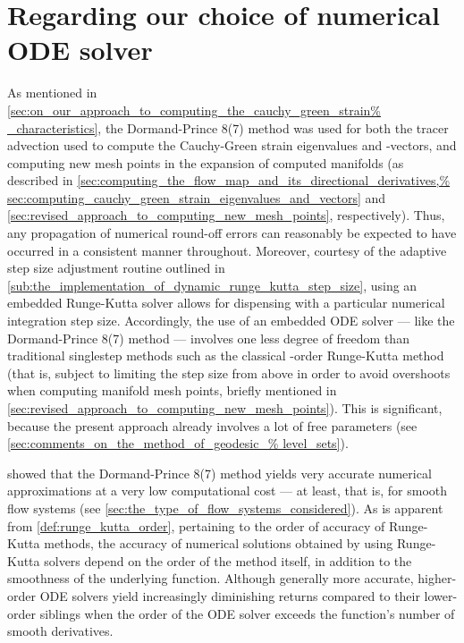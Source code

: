 \section{Regarding our choice of numerical ODE solver}
\label{sec:regarding_our_choice_of_numerical_ode_solver}

As mentioned in \cref{sec:on_our_approach_to_computing_the_cauchy_green_strain%
_characteristics}, the Dormand-Prince 8(7) method was used for both the tracer
advection used to compute the Cauchy-Green strain eigenvalues and -vectors, and
computing new mesh points in the expansion of computed manifolds (as described
in  \cref{sec:computing_the_flow_map_and_its_directional_derivatives,%
sec:computing_cauchy_green_strain_eigenvalues_and_vectors} and
\cref{sec:revised_approach_to_computing_new_mesh_points}, respectively). Thus,
any propagation of numerical round-off errors can reasonably be expected to
have occurred in a consistent manner throughout. Moreover, courtesy of the
adaptive step size adjustment routine outlined in
\cref{sub:the_implementation_of_dynamic_runge_kutta_step_size}, using an
embedded Runge-Kutta solver allows for dispensing with a particular numerical
integration step size. Accordingly, the use of an embedded ODE solver --- like
the Dormand-Prince 8(7) method --- involves one less degree of freedom than
traditional singlestep methods such as the classical -order Runge-Kutta
method (that is, subject to limiting the step size from above in order to avoid
overshoots when computing manifold mesh points, briefly mentioned in
\cref{sec:revised_approach_to_computing_new_mesh_points}). This is
significant, because the present approach already involves a lot of free
parameters (see \cref{sec:comments_on_the_method_of_geodesic_%
level_sets}).

\textcite{loken2017sensitivity} showed that the Dormand-Prince 8(7) method
yields very accurate numerical approximations at a very low computational cost
--- at least, that is, for smooth flow systems (see
\cref{sec:the_type_of_flow_systems_considered}). As is apparent from
\cref{def:runge_kutta_order}, pertaining to the order of accuracy of
Runge-Kutta methods, the accuracy of numerical solutions obtained by using
Runge-Kutta solvers depend on the order of the method itself, in addition to
the smoothness of the underlying function. Although generally more accurate,
higher-order ODE solvers yield increasingly diminishing returns compared to
their lower-order siblings when the order of the ODE solver exceeds the
function's number of smooth derivatives.

